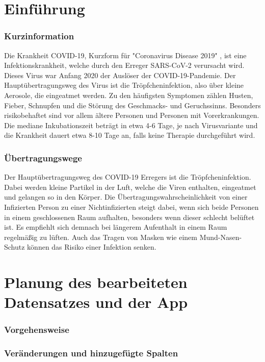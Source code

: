 \documentclass[12pt]{IEEEtran}
\begin{document}
\section{Einführung}

\subsubsection{Kurzinformation}

Die Krankheit COVID-19, Kurzform für "Coronavirus Disease 2019" \cite{abbr}, ist eine Infektionskrankheit, welche durch den Erreger SARS-CoV-2 verursacht wird. Dieses Virus war Anfang 2020 der Auslöser der COVID-19-Pandemie. Der Hauptübertragungsweg des Virus ist die Tröpfcheninfektion, also über kleine Aerosole, die eingeatmet werden. Zu den häufigsten Symptomen zählen Husten, Fieber, Schnupfen und die Störung des Geschmacks- und Geruchssinns. Besonders risikobehaftet sind vor allem ältere Personen und Personen mit Vorerkrankungen. Die mediane Inkubationszeit beträgt in etwa 4-6 Tage, je nach Virusvariante und die Krankheit dauert etwa 8-10 Tage an, falls keine Therapie durchgeführt wird. \cite{rki}

\subsubsection{Übertragungswege}

Der Hauptübertragungsweg des COVID-19 Erregers ist die Tröpfcheninfektion. Dabei werden kleine Partikel in der Luft, welche die Viren enthalten, eingeatmet und gelangen so in den Körper. Die Übertragungswahrscheinlichkeit von einer Infizierten Person zu einer Nichtinfizierten steigt dabei, wenn sich beide Personen in einem geschlossenen Raum aufhalten, besonders wenn dieser schlecht belüftet ist. Es empfiehlt sich demnach bei längerem Aufenthalt in einem Raum regelmäßig zu lüften. Auch das Tragen von Masken wie einem Mund-Nasen-Schutz können das Risiko einer Infektion senken. 

\section{Planung des bearbeiteten Datensatzes und der App}
\subsubsection{Vorgehensweise}
\subsubsection{Veränderungen und hinzugefügte Spalten}
\end{document}
